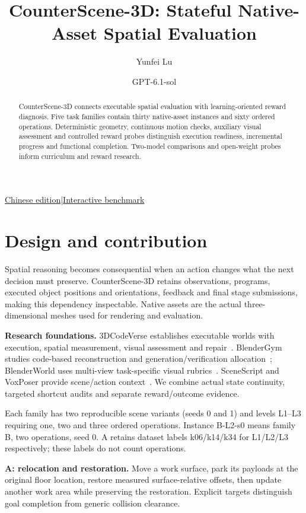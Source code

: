 \documentclass[10pt]{article}
\title{CounterScene-3D: Stateful Native-Asset Spatial Evaluation}
\author{Yunfei Lu \and GPT-6.1-sol}\date{}
\begin{document}
\maketitle
\begin{center}\small\href{report_zh.pdf}{Chinese edition}\quad|\quad\href{https://mikelyfei.github.io/CounterScene-3D/}{Interactive benchmark}\end{center}
\begin{abstract}
CounterScene-3D connects executable spatial evaluation with learning-oriented reward diagnosis. Five task families contain thirty native-asset instances and sixty ordered operations. Deterministic geometry, continuous motion checks, auxiliary visual assessment and controlled reward probes distinguish execution readiness, incremental progress and functional completion. Two-model comparisons and open-weight probes inform curriculum and reward research.
\end{abstract}

\section{Design and contribution}
Spatial reasoning becomes consequential when an action changes what the next decision must preserve. CounterScene-3D retains observations, programs, executed object positions and orientations, feedback and final stage submissions, making this dependency inspectable. Native assets are the actual three-dimensional meshes used for rendering and evaluation.

\textbf{Research foundations.} 3DCodeVerse establishes executable worlds with execution, spatial measurement, visual assessment and repair~\cite{codeverse}. BlenderGym studies code-based reconstruction and generation/verification allocation~\cite{blendergym}; BlenderWorld uses multi-view task-specific visual rubrics~\cite{blenderworld}. SceneScript and VoxPoser provide scene/action context~\cite{scenescript,voxposer}. We combine actual state continuity, targeted shortcut audits and separate reward/outcome evidence. 

Each family has two reproducible scene variants (seeds 0 and 1) and levels L1--L3 requiring one, two and three ordered operations. Instance B-L2-s0 means family B, two operations, seed 0. A retains dataset labels k06/k14/k34 for L1/L2/L3 respectively; these labels do not count operations. 

\textbf{A: relocation and restoration.} Move a work surface, park its payloads at the original floor location, restore measured surface-relative offsets, then update another work area while preserving the restoration. Explicit targets distinguish goal completion from generic collision clearance.
\end{document}
